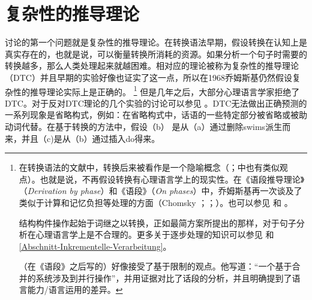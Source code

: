 \section{复杂性的推导理论}
\label{sec-dtc}

 \citet{SW2011a}讨论的第一个问题就是复杂性的推导理论。在转换语法早期，假设转换在认知上是真实存在的，也就是说，可以衡量转换所消耗的资源。如果分析一个句子时需要的转换越多，那么人类处理起来就越困难。相对应的理论被称为复杂性的推导理论（DTC）并且早期的实验好像也证实了这一点\citep{MMK64a,SP65a,CO66a}，所以在1968乔姆斯基仍然假设复杂性的推导理论实际上是正确的\citep[--250]{Chomsky76b-u}。 \footnote{%
在转换语法的文献中，转换后来被看作是一个隐喻概念（\citealp[]{Lohnstein2014a}；\citealp[Footnote~4]{Chomsky2001a-u}中也有类似观点）。也就是说，不再假设转换有心理语言学上的现实性。在《语段推导理论》（\emph{Derivation by phase}）和《语段》（\emph{On phases}）中，乔姆斯基再一次谈及了类似于计算和记忆负担等处理的方面（Chomsky \citeyear[, 12,15]{Chomsky2001a-u}；\citeyear[, 12]{Chomsky2007a}；\citeyear[, 145, 146,155]{Chomsky2008a}）。也可以参见 和 。

结构构件操作起始于词继之以转换，正如最简方案所提出的那样，对于句子分析在心理语言学上是不合理的。更多关于逐步处理的知识可以参见 和\ref{Abschnitt-Inkrementelle-Verarbeitung}。

 \citet[]{Chomsky2007a}（在《语段》之后写的）好像接受了基于限制的观点。他写道：“一个基于合并的系统涉及到并行操作”，并用证据对比了话段的分析，并且明确提到了语言能力/语言运用的差异。 %
} 但是几年之后，大部分心理语言学家拒绝了DTC。对于反对DTC理论的几个实验的讨论可以参见 。DTC无法做出正确预测的一系列现象是省略构式，例如\citep*[]{FBG74a-u}：在省略构式中，话语的一些特定部分被省略或被助动词代替。在基于转换的方法中，假设（b） 是从（a）通过删除swims派生而来，并且（c)是从（b）通过插入do得来。
